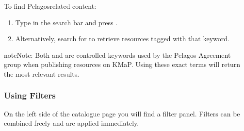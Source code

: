 \documentclass[letterpaper,10pt,english]{sphinxmanual}
\begin{document}
\sphinxAtStartPar
To find Pelagos\sphinxhyphen{}related content:
\begin{enumerate}
%
\item {} 
\sphinxAtStartPar
Type  in the search bar and press .

\item {} 
\sphinxAtStartPar
Alternatively, search for  to retrieve resources tagged
with that keyword.

\end{enumerate}

\begin{sphinxadmonition}{note}{Note:}
\sphinxAtStartPar
Both  and  are controlled keywords used by
the Pelagos Agreement group when publishing resources on KMaP. Using these exact terms
will return the most relevant results.
\end{sphinxadmonition}


\subsubsection{Using Filters}
\label{\detokenize{en/02_find_and_visualize:using-filters}}
\sphinxAtStartPar
On the left side of the catalogue page you will find a filter panel. Filters can be
combined freely and are applied immediately.
\end{document}
